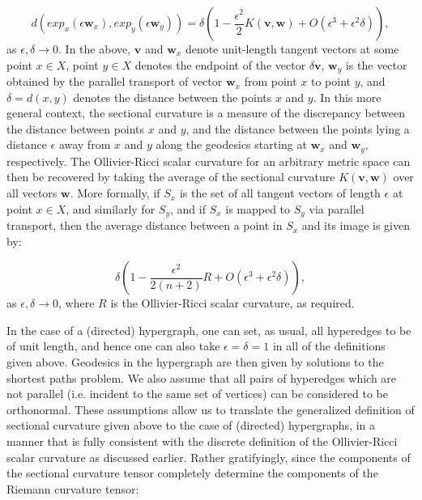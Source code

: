 \documentclass{article}
\begin{document}
\begin{equation}
d \left( exp_x \left( \epsilon \mathbf{w}_x \right), exp_y \left( \epsilon \mathbf{w}_y \right) \right) = \delta \left( 1 - \frac{\epsilon^2}{2} K \left( \mathbf{v}, \mathbf{w} \right) + O \left( \epsilon^3 + \epsilon^2 \delta \right) \right),
\end{equation}
as ${\epsilon, \delta \to 0}$. In the above, ${\mathbf{v}}$ and ${\mathbf{w}_x}$ denote unit-length tangent vectors at some point ${x \in X}$, point ${y \in X}$ denotes the endpoint of the vector ${\delta \mathbf{v}}$, ${\mathbf{w}_y}$ is the vector obtained by the parallel transport of vector ${\mathbf{w}_x}$ from point $x$ to point $y$, and ${\delta = d \left( x, y \right)}$ denotes the distance between the points $x$ and $y$. In this more general context, the sectional curvature is a measure of the discrepancy between the distance between points $x$ and $y$, and the distance between the points lying a distance ${\epsilon}$ away from $x$ and $y$ along the geodesics starting at ${\mathbf{w}_x}$ and ${\mathbf{w}_y}$, respectively. The Ollivier-Ricci scalar curvature for an arbitrary metric space can then be recovered by taking the average of the sectional curvature ${K \left( \mathbf{v}, \mathbf{w} \right)}$ over all vectors ${\mathbf{w}}$. More formally, if ${S_x}$ is the set of all tangent vectors of length ${\epsilon}$ at point ${x \in X}$, and similarly for ${S_y}$, and if ${S_x}$ is mapped to ${S_y}$ via parallel transport, then the average distance between a point in ${S_x}$ and its image is given by:

\begin{equation}
\delta \left( 1 - \frac{\epsilon^2}{2 \left( n + 2 \right)} R + O \left( \epsilon^3 + \epsilon^2 \delta \right) \right),
\end{equation}
as ${\epsilon, \delta \to 0}$, where $R$ is the Ollivier-Ricci scalar curvature, as required.

In the case of a (directed) hypergraph, one can set, as usual, all hyperedges to be of unit length, and hence one can also take ${\epsilon = \delta = 1}$ in all of the definitions given above. Geodesics in the hypergraph are then given by solutions to the shortest paths problem. We also assume that all pairs of hyperedges which are not parallel (i.e. incident to the same set of vertices) can be considered to be orthonormal. These assumptions allow us to translate the generalized definition of sectional curvature given above to the case of (directed) hypergraphs, in a manner that is fully consistent with the discrete definition of the Ollivier-Ricci scalar curvature as discussed earlier. Rather gratifyingly, since the components of the sectional curvature tensor completely determine the components of the Riemann curvature tensor:
\end{document}
